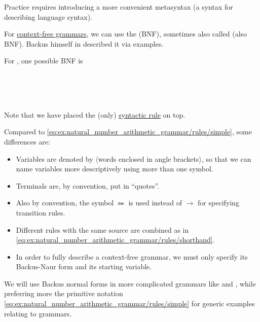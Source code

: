 \begin{remark}\label{rem:backus_normal_form}
  Practice requires introducing a more convenient metasyntax (a syntax for describing language syntax).

  For \hyperref[def:chomsky_hierarchy/context_free]{context-free grammars}, we can use the  (BNF), sometimes also called  (also BNF). Backus himself in \cite[14]{Backus1958} described it via examples.

  For , one possible BNF is
  \begin{bnf*}
         { \bnfor \bnftsq{(} \bnfsp {} \bnfsp {} \bnfsp {} \bnfsp \bnftsq{)}} \\
          {\bnftsq{\( + \)} \bnfor \bnftsq{\( \times \)}} \\
     { \bnfor {} \bnfor {} \bnfsp {}} \\
       { \bnfor {} \bnfsp {} \bnfor {} \bnfor {} \bnfsp {}}
  \end{bnf*}

  Note that we have placed the (only) \hyperref[rem:abstract_syntax_tree/syntactic]{syntactic rule} on top.

  Compared to \eqref{eq:ex:natural_number_arithmetic_grammar/rules/simple}, some differences are:
  \begin{itemize}
    \item Variables are denoted by \( \langle \)words enclosed in angle brackets\( \rangle \), so that we can name variables more descriptively using more than one symbol.
    \item Terminals are, by convention, put in \enquote{quotes}.
    \item Also by convention, the symbol \( \Coloneqq \) is used instead of \( \to \) for specifying transition rules.
    \item Different rules with the same source are combined as in \eqref{eq:ex:natural_number_arithmetic_grammar/rules/shorthand}.
    \item In order to fully describe a context-free grammar, we must only specify its Backus-Naur form and its starting variable.
  \end{itemize}
\end{remark}
\begin{comments}
  \item We will use Backus normal forms in more complicated grammars like  and , while preferring more the primitive notation \eqref{eq:ex:natural_number_arithmetic_grammar/rules/simple} for generic examples relating to grammars.
\end{comments}

